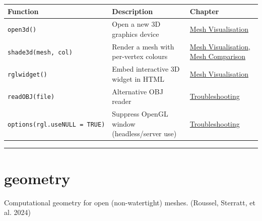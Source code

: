 \documentclass[
  11pt,
  letterpaper,
  DIV=11,
  numbers=noendperiod]{scrreprt}
\begin{document}
\begin{longtable}[]{@{}
  >{\raggedright\arraybackslash}p{}
  >{\raggedright\arraybackslash}p{}
  >{\raggedright\arraybackslash}p{}@{}}
\toprule\noalign{}
\begin{minipage}[b]{\linewidth}\raggedright
Function
\end{minipage} & \begin{minipage}[b]{\linewidth}\raggedright
Description
\end{minipage} & \begin{minipage}[b]{\linewidth}\raggedright
Chapter
\end{minipage} \\
\midrule\noalign{}
\endhead
\bottomrule\noalign{}
\endlastfoot
\texttt{open3d()} & Open a new 3D graphics device &
\hyperref[d-visualisation]{Mesh Visualisation} \\
\texttt{shade3d(mesh,\ col)} & Render a mesh with per-vertex colours &
\hyperref[d-visualisation]{Mesh Visualisation},
\hyperref[mesh-comparison]{Mesh Comparison} \\
\texttt{rglwidget()} & Embed interactive 3D widget in HTML &
\hyperref[d-visualisation]{Mesh Visualisation} \\
\texttt{readOBJ(file)} & Alternative OBJ reader &
\href{troubleshooting.qmd}{Troubleshooting} \\
\texttt{options(rgl.useNULL\ =\ TRUE)} & Suppress OpenGL window
(headless/server use) & \href{troubleshooting.qmd}{Troubleshooting} \\
\end{longtable}

\begin{center}\rule{0.5\linewidth}{0.5pt}\end{center}

\section{geometry}\label{geometry}

Computational geometry for open (non-watertight) meshes. (Roussel,
Sterratt, et al. 2024)
\end{document}
